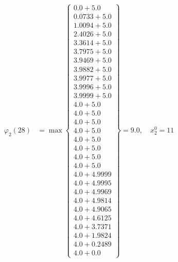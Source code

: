 \documentclass{article}
\begin{document}
\begin{align*}
  
\varphi_{2}(28) &= \max \left\{ \begin{array}{c}
0.0 + 5.0 \\
 0.0733 + 5.0 \\
 1.0094 + 5.0 \\
 2.4026 + 5.0 \\
 3.3614 + 5.0 \\
 3.7975 + 5.0 \\
 3.9469 + 5.0 \\
 3.9882 + 5.0 \\
 3.9977 + 5.0 \\
 3.9996 + 5.0 \\
 3.9999 + 5.0 \\
 4.0 + 5.0 \\
 4.0 + 5.0 \\
 4.0 + 5.0 \\
 4.0 + 5.0 \\
 4.0 + 5.0 \\
 4.0 + 5.0 \\
 4.0 + 5.0 \\
 4.0 + 5.0 \\
 4.0 + 4.9999 \\
 4.0 + 4.9995 \\
 4.0 + 4.9969 \\
 4.0 + 4.9814 \\
 4.0 + 4.9065 \\
 4.0 + 4.6125 \\
 4.0 + 3.7371 \\
 4.0 + 1.9824 \\
 4.0 + 0.2489 \\
 4.0 + 0.0
\end{array} \right\}=9.0,\quad x_{2}^0=11\\
  
  
  

\end{align*}
\end{document}
